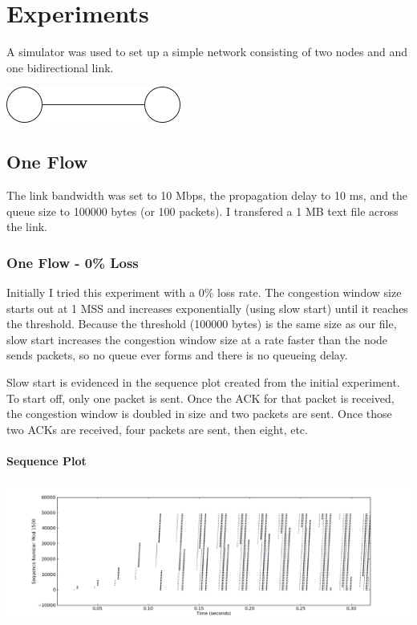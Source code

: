 \documentclass[11pt]{article}
\begin{document}
\section{Experiments}
A simulator was used to set up a simple network consisting of two nodes and and one bidirectional link.
\begin{center}
\includegraphics{two-nodes-one-link.png}
\end{center}

\subsection{One Flow}
The link bandwidth was set to 10 Mbps, the propagation delay to 10 ms, and the queue size to 100000 bytes (or 100 packets). I transfered a 1 MB text file across the link. 

\subsubsection{One Flow - 0\% Loss}
Initially I tried this experiment with a 0\% loss rate. The congestion window size starts out at 1 MSS and increases exponentially (using slow start) until it reaches the threshold. Because the threshold (100000 bytes) is the same size as our file, slow start increases the congestion window size at a rate faster than the node sends packets, so no queue ever forms and there is no queueing delay.

Slow start is evidenced in the sequence plot created from the initial experiment. To start off, only one packet is sent. Once the ACK for that packet is received, the congestion window is doubled in size and two packets are sent. Once those two ACKs are received, four packets are sent, then eight, etc.

\paragraph{Sequence Plot} \hspace{2mm}
\begin{center}
\includegraphics[width=20cm]{../plot/one_flow_0_loss/sequence.png}
\end{center}
\end{document}
